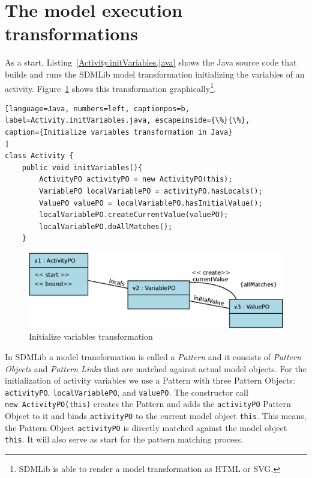 \documentclass[submission,copyright,creativecommons]{eptcs}
\begin{document}
\section{The model execution transformations}
\label{sec:ModelExecutionTrafos}

As a start, Listing~\ref{Activity.initVariables.java} shows the Java source code 
that builds and runs the SDMLib model transformation initializing the variables
of an activity. Figure~\ref{fig:Activity.initVariables} shows this transformation 
graphically\footnote{SDMLib is able to render a model transformation as HTML or SVG.}. 


\begin{lstlisting}[language=Java, numbers=left, captionpos=b, 
label=Activity.initVariables.java, escapeinside={\%}{\%},
caption={Initialize variables transformation in Java}
]
class Activity {
    public void initVariables(){
        ActivityPO activityPO = new ActivityPO(this);
        VariablePO localVariablePO = activityPO.hasLocals();
        ValuePO valuePO = localVariablePO.hasInitialValue();
        localVariablePO.createCurrentValue(valuePO);
        localVariablePO.doAllMatches();
    }
\end{lstlisting}

\begin{figure}[ht] \centering
	\includegraphics[width=0.8\linewidth]{images/Activity.initVariables.eps}
 \caption{Initialize variables transformation}
 \label{fig:Activity.initVariables}
\end{figure}

In SDMLib a model transformation is called a \emph{Pattern} and it consists 
of \emph{Pattern Objects} and \emph{Pattern Links} that are matched against 
actual model objects. For the initialization of activity variables we use a 
Pattern with three Pattern Objects: \texttt{activityPO}, \texttt{localVariablePO}, 
and \texttt{valuePO}. The constructor call \texttt{new~ActivityPO(this)} creates 
the Pattern and adds the \texttt{activityPO} Pattern Object to it and binds 
\texttt{activityPO} to the current model object \texttt{this}. This means, 
the Pattern Object \texttt{activityPO} is directly matched against the 
model object \texttt{this}. It will also serve as start for the pattern 
matching process. 
\end{document}
